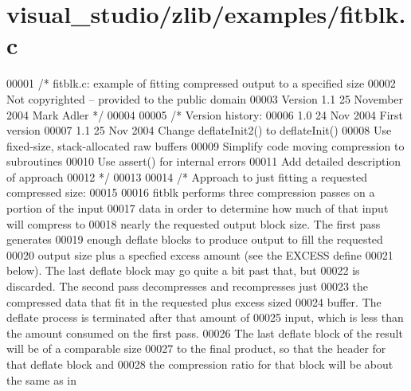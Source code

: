 \hypertarget{visual__studio_2zlib_2examples_2fitblk_8c_source}{}\section{visual\+\_\+studio/zlib/examples/fitblk.c}
\label{visual__studio_2zlib_2examples_2fitblk_8c_source}

\begin{DoxyCode}
00001 \textcolor{comment}{/* fitblk.c: example of fitting compressed output to a specified size}
00002 \textcolor{comment}{   Not copyrighted -- provided to the public domain}
00003 \textcolor{comment}{   Version 1.1  25 November 2004  Mark Adler */}
00004 
00005 \textcolor{comment}{/* Version history:}
00006 \textcolor{comment}{   1.0  24 Nov 2004  First version}
00007 \textcolor{comment}{   1.1  25 Nov 2004  Change deflateInit2() to deflateInit()}
00008 \textcolor{comment}{                     Use fixed-size, stack-allocated raw buffers}
00009 \textcolor{comment}{                     Simplify code moving compression to subroutines}
00010 \textcolor{comment}{                     Use assert() for internal errors}
00011 \textcolor{comment}{                     Add detailed description of approach}
00012 \textcolor{comment}{ */}
00013 
00014 \textcolor{comment}{/* Approach to just fitting a requested compressed size:}
00015 \textcolor{comment}{}
00016 \textcolor{comment}{   fitblk performs three compression passes on a portion of the input}
00017 \textcolor{comment}{   data in order to determine how much of that input will compress to}
00018 \textcolor{comment}{   nearly the requested output block size.  The first pass generates}
00019 \textcolor{comment}{   enough deflate blocks to produce output to fill the requested}
00020 \textcolor{comment}{   output size plus a specfied excess amount (see the EXCESS define}
00021 \textcolor{comment}{   below).  The last deflate block may go quite a bit past that, but}
00022 \textcolor{comment}{   is discarded.  The second pass decompresses and recompresses just}
00023 \textcolor{comment}{   the compressed data that fit in the requested plus excess sized}
00024 \textcolor{comment}{   buffer.  The deflate process is terminated after that amount of}
00025 \textcolor{comment}{   input, which is less than the amount consumed on the first pass.}
00026 \textcolor{comment}{   The last deflate block of the result will be of a comparable size}
00027 \textcolor{comment}{   to the final product, so that the header for that deflate block and}
00028 \textcolor{comment}{   the compression ratio for that block will be about the same as in}

\end{DoxyCode}
